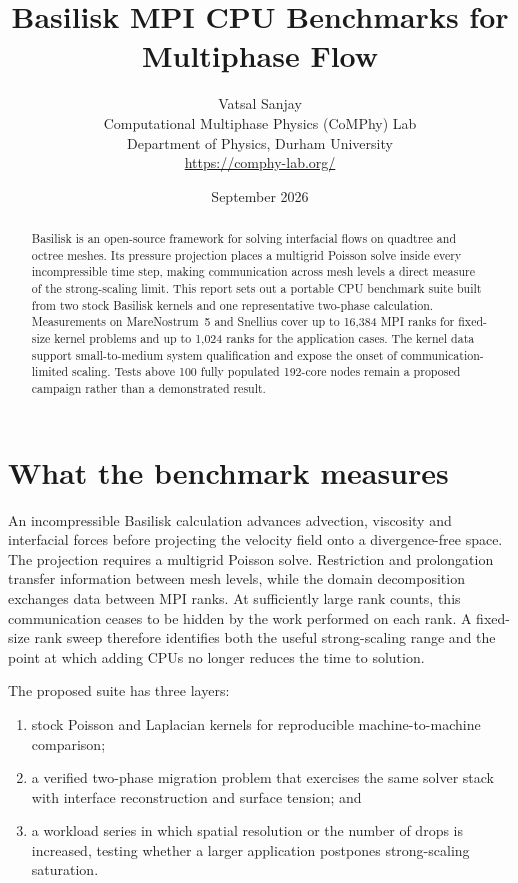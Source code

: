 \documentclass[11pt,a4paper]{article}
\title{\textbf{Basilisk MPI CPU Benchmarks for Multiphase Flow}}
\author{Vatsal Sanjay\\
\small Computational Multiphase Physics (CoMPhy) Lab\\
\small Department of Physics, Durham University\\
\small \url{https://comphy-lab.org/}}
\date{September 2026}
\begin{document}
\maketitle

\begin{abstract}
Basilisk is an open-source framework for solving interfacial flows on
quadtree and octree meshes. Its pressure projection places a multigrid
Poisson solve inside every incompressible time step, making communication
across mesh levels a direct measure of the strong-scaling limit. This report
sets out a portable CPU benchmark suite built from two stock Basilisk kernels
and one representative two-phase calculation. Measurements on MareNostrum~5
and Snellius cover up to 16,384 MPI ranks for fixed-size kernel problems and
up to 1,024 ranks for the application cases. The kernel data support
small-to-medium system qualification and expose the onset of
communication-limited scaling. Tests above 100 fully populated 192-core nodes
remain a proposed campaign rather than a demonstrated result.
\end{abstract}

\section{What the benchmark measures}

An incompressible Basilisk calculation advances advection, viscosity and
interfacial forces before projecting the velocity field onto a divergence-free
space. The projection requires a multigrid Poisson solve. Restriction and
prolongation transfer information between mesh levels, while the domain
decomposition exchanges data between MPI ranks. At sufficiently large rank
counts, this communication ceases to be hidden by the work performed on each
rank. A fixed-size rank sweep therefore identifies both the useful
strong-scaling range and the point at which adding CPUs no longer reduces the
time to solution.

The proposed suite has three layers:
\begin{enumerate}
  \item stock Poisson and Laplacian kernels for reproducible machine-to-machine
        comparison;
  \item a verified two-phase migration problem that exercises the same solver
        stack with interface reconstruction and surface tension; and
  \item a workload series in which spatial resolution or the number of drops
        is increased, testing whether a larger application postpones
        strong-scaling saturation.
\end{enumerate}
\end{document}
